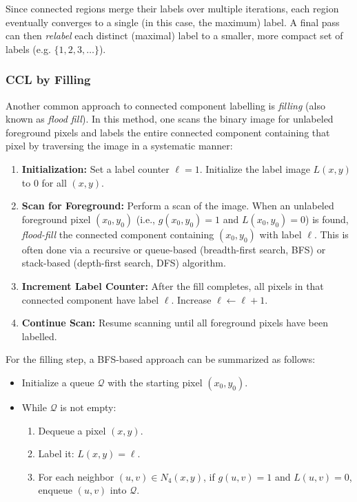 \documentclass[a4paper,12pt]{article}
\begin{document}
Since connected regions merge their labels over multiple iterations, each region eventually converges to a single (in this case, the maximum) label. A final pass can then \emph{relabel} each distinct (maximal) label to a smaller, more compact set of labels (e.g. \(\{1, 2, 3, \dots\}\)).

\subsubsection{CCL by Filling}

Another common approach to connected component labelling is \emph{filling} (also known as \emph{flood fill}). In this method, one scans the binary image for unlabeled foreground pixels and labels the entire connected component containing that pixel by traversing the image in a systematic manner:

\begin{enumerate}
    \item \textbf{Initialization:} Set a label counter \(\ell = 1\). Initialize the label image \(L(x, y)\) to \(0\) for all \((x, y)\).
    \item \textbf{Scan for Foreground:} Perform a scan of the image. When an unlabeled foreground pixel \((x_0, y_0)\) (i.e., \(g(x_0, y_0) = 1\) and \(L(x_0, y_0) = 0\)) is found, \emph{flood-fill} the connected component containing \((x_0, y_0)\) with label \(\ell\). This is often done via a recursive or queue-based (breadth-first search, BFS) or stack-based (depth-first search, DFS) algorithm.
    \item \textbf{Increment Label Counter:} After the fill completes, all pixels in that connected component have label \(\ell\). Increase \(\ell \leftarrow \ell + 1\).
    \item \textbf{Continue Scan:} Resume scanning until all foreground pixels have been labelled.
\end{enumerate}

For the filling step, a BFS-based approach can be summarized as follows:

\begin{itemize}
    \item Initialize a queue \(\mathcal{Q}\) with the starting pixel \((x_0, y_0)\).
    \item While \(\mathcal{Q}\) is not empty:
    \begin{enumerate}
        \item Dequeue a pixel \((x, y)\).
        \item Label it: \(L(x, y) = \ell\).
        \item For each neighbor \((u, v)\in N_4(x, y)\), if \(g(u, v) = 1\) and \(L(u, v) = 0\), enqueue \((u, v)\) into \(\mathcal{Q}\).
    \end{enumerate}
\end{itemize}
\end{document}
